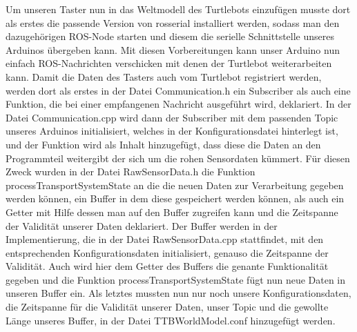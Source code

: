 \documentclass[a4paper,12pt,headsepline]{scrartcl}
\begin{document}
Um unseren Taster nun in das Weltmodell des Turtlebots einzufügen musste dort als erstes die passende Version von rosserial installiert werden, sodass man den dazugehörigen ROS-Node starten und diesem die serielle Schnittstelle unseres Arduinos übergeben kann. Mit diesen Vorbereitungen kann unser Arduino nun einfach ROS-Nachrichten verschicken mit denen der Turtlebot weiterarbeiten kann. Damit die Daten des Tasters auch vom Turtlebot registriert werden, werden dort als erstes in der Datei Communication.h ein Subscriber als auch eine Funktion, die bei einer empfangenen Nachricht ausgeführt wird, deklariert. In der Datei Communication.cpp wird dann der Subscriber mit dem passenden Topic unseres Arduinos initialisiert, welches in der Konfigurationsdatei hinterlegt ist, und der Funktion wird als Inhalt hinzugefügt, dass diese die Daten an den Programmteil weitergibt der sich um die rohen Sensordaten kümmert. Für diesen Zweck wurden in der Datei RawSensorData.h die Funktion processTransportSystemState an die die neuen Daten zur Verarbeitung gegeben werden können, ein Buffer in dem diese gespeichert werden können, als auch ein Getter mit Hilfe dessen man auf den Buffer zugreifen kann und die Zeitspanne der Validität unserer Daten deklariert. Der Buffer werden in der Implementierung, die in der Datei RawSensorData.cpp stattfindet, mit den entsprechenden Konfigurationsdaten initialisiert, genauso die Zeitspanne der Validität. Auch wird hier dem Getter des Buffers die genante Funktionalität gegeben und die Funktion processTransportSystemState fügt nun neue Daten in unseren Buffer ein. Als letztes mussten nun nur noch unsere Konfigurationsdaten, die Zeitspanne für die Validität unserer Daten, unser Topic und die gewollte Länge unseres Buffer, in der Datei TTBWorldModel.conf hinzugefügt werden.\\
\end{document}
